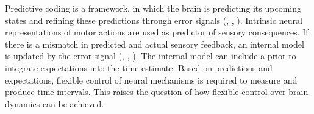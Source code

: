 \documentclass[10pt]{article}
\begin{document}
Predictive coding is a framework, in which the brain is predicting its upcoming states and refining these predictions through error signals (\cite{Rao1999}, \cite{Huang2011}, \cite{Ficco2021}).
Intrinsic neural representations of motor actions are used as predictor of sensory consequences. %
If there is a mismatch in predicted and actual sensory feedback, an internal model is updated by the error signal (\cite{Bubic2010}, \cite{Clark2013}, \cite{Straka2018}). %
The internal model can include a prior to integrate expectations into the time estimate.
Based on predictions and expectations, flexible control of neural mechanisms is required to measure and produce time intervals.
This raises the question of how flexible control over brain dynamics can be achieved.

\end{document}
